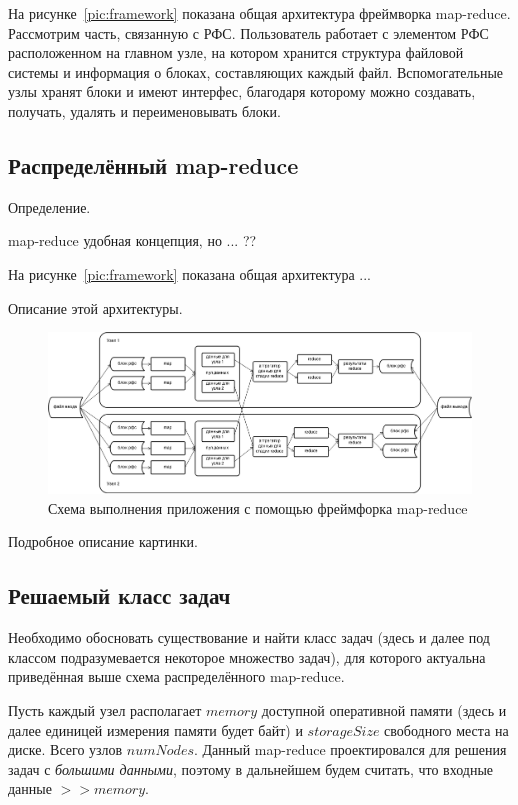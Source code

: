 \documentclass[12pt,a4paper,oneside]{extarticle}
\begin{document}
        На рисунке~\ref{pic:framework} показана общая архитектура фреймворка map-reduce. Рассмотрим часть, связанную с РФС.
        Пользователь работает с элементом РФС расположенном на главном узле, на котором хранится структура файловой системы и информация о блоках, составляющих каждый файл.
        Вспомогательные узлы хранят блоки и имеют интерфес, благодаря которому можно создавать, получать, удалять и переименовывать блоки.
    \clearpage
    \subsection{Распределённый map-reduce}
        Определение.

        map-reduce удобная концепция, но ... ??

        На рисунке~\ref{pic:framework} показана общая архитектура ...

        Описание этой архитектуры.

        \begin{figure}[h!]
            \centering
            \includegraphics[scale=0.5,angle=90,origin=c]{map_reduce_framework.png}
            \caption{Схема выполнения приложения с помощью фреймфорка map-reduce}
            \label{pic:mr_framework}
        \end{figure}
        
        Подробное описание картинки.
        
    \clearpage

    \subsection{Решаемый класс задач}
    \label{sec:tasks}
        Необходимо обосновать существование и найти класс задач (здесь и далее под классом подразумевается некоторое множество задач), для которого актуальна приведённая выше схема распределённого map-reduce.

        Пусть каждый узел располагает $memory$ доступной оперативной памяти (здесь и далее единицей измерения памяти будет байт) и $storageSize$ свободного места на диске. Всего узлов $numNodes$. Данный map-reduce проектировался для решения задач с {\it большими данными}, поэтому в дальнейшем будем считать, что входные данные $>>memory$. 
\end{document}
